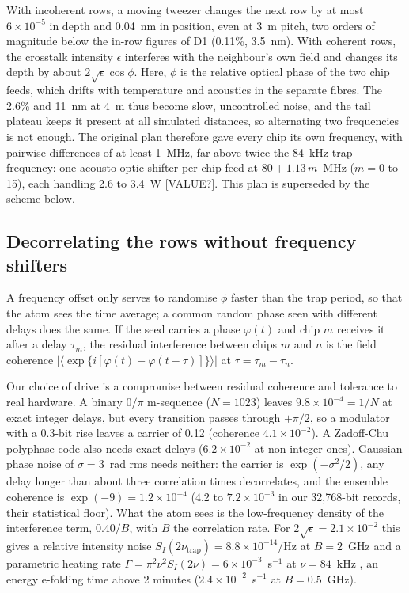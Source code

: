 With incoherent rows, a moving tweezer changes the next row by at most $6\times10^{-5}$ in depth and 0.04~nm in
position, even at 3~\textmu m pitch, two orders of magnitude below the in-row figures of D1 (0.11\%, 3.5~nm).
With coherent rows, the crosstalk intensity $\epsilon$ interferes with the neighbour's own field and changes
its depth by about $2\sqrt{\epsilon}\cos\phi$. Here, $\phi$ is the relative optical phase of the two chip feeds,
which drifts with temperature and acoustics in the separate fibres. The 2.6\% and 11~nm at 4~\textmu m thus
become slow, uncontrolled noise, and the tail plateau keeps it present at all simulated distances, so
alternating two frequencies is not enough. The original plan therefore gave every chip its own frequency, with
pairwise differences of at least 1~MHz, far above twice the 84~kHz trap frequency: one acousto-optic shifter
per chip feed at $80+1.13\,m$~MHz ($m=0$ to 15), each handling 2.6 to 3.4~W [VALUE?]. This plan is superseded
by the scheme below.

\subsection{Decorrelating the rows without frequency shifters}\label{sec:rows-decorrelate}

A frequency offset only serves to randomise $\phi$ faster than the trap period, so that the atom sees the time
average; a common random phase seen with different delays does the same. If the seed carries a phase
$\varphi(t)$ and chip $m$ receives it after a delay $\tau_m$, the residual interference between chips $m$ and
$n$ is the field coherence $|\langle\exp\{i[\varphi(t)-\varphi(t-\tau)]\}\rangle|$ at $\tau=\tau_m-\tau_n$.

Our choice of drive is a compromise between residual coherence and tolerance to real hardware. A binary
$0/\pi$ m-sequence ($N=1023$) leaves $9.8\times10^{-4}=1/N$ at exact integer delays, but every transition passes
through $+\pi/2$, so a modulator with a 0.3-bit rise leaves a carrier of 0.12 (coherence $4.1\times10^{-2}$). A
Zadoff-Chu polyphase code also needs exact delays ($6.2\times10^{-2}$ at non-integer ones). Gaussian phase noise
of $\sigma=3$~rad rms needs neither: the carrier is $\exp(-\sigma^2/2)$, any delay longer than about three
correlation times decorrelates, and the ensemble coherence is $\exp(-9)=1.2\times10^{-4}$ (4.2 to
$7.2\times10^{-3}$ in our 32,768-bit records, their statistical floor). What the atom sees is the low-frequency
density of the interference term, $0.40/B$, with $B$ the correlation rate. For $2\sqrt{\epsilon}=2.1\times10^{-2}$
this gives a relative intensity noise $S_I(2\nu_\mathrm{trap})=8.8\times10^{-14}$/Hz at $B=2$~GHz and a
parametric heating rate $\Gamma=\pi^2\nu^2S_I(2\nu)=6\times10^{-3}$~s$^{-1}$ at $\nu=84$~kHz \cite{OHARA}, an
energy e-folding time above 2 minutes ($2.4\times10^{-2}$~s$^{-1}$ at $B=0.5$~GHz).

